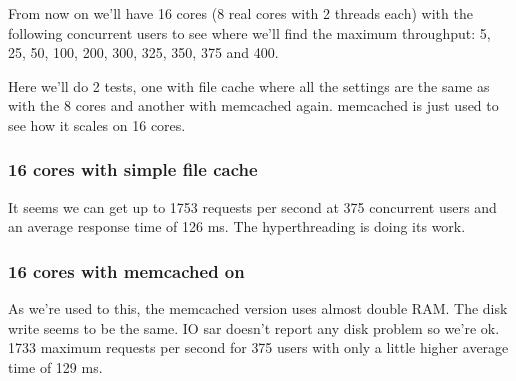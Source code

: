 From now on we'll have 16 cores (8 real cores with 2 threads each) with the following concurrent users to see where we'll find the maximum throughput: 5, 25, 50, 100, 200, 300, 325, 350, 375 and 400.

Here we'll do 2 tests, one with file cache where all the settings are the same as with the 8 cores and another with \gls{memcached} again. \gls{memcached} is just used to see how it scales on 16 cores. 
\subsubsection{16 cores with simple file cache}
It seems we can get up to 1753 requests per second at 375 concurrent users and an average response time of 126 ms. The \gls{hyperthreading} is doing its work. 
\subsubsection{16 cores with memcached on}
As we're used to this, the \gls{memcached} version uses almost double RAM. The disk write seems to be the same. IO sar doesn't report any disk problem so we're ok. 1733 maximum requests per second for 375 users with only a little higher average time of 129 ms.
